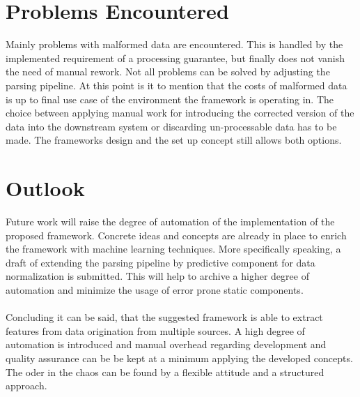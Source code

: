 \section{Problems Encountered\label{sec:problems}}

Mainly problems with malformed data are encountered. This is handled by the implemented requirement of a processing guarantee, but finally does not vanish the need of manual rework. Not all problems can be solved by adjusting the parsing pipeline. At this point is it to mention that the costs of malformed data is up to final use case of the environment the framework is operating in. The choice between applying manual work for introducing the corrected version of the data into the downstream system or discarding un-processable data has to be made. The frameworks design and the set up concept still allows both options. 

\section{Outlook\label{sec:outlook}}

Future work will raise the degree of automation of the implementation of the proposed framework. Concrete ideas and concepts are already in place to enrich the framework with machine learning techniques. More specifically speaking, a draft of extending the parsing pipeline by predictive component for data normalization is submitted. This will help to archive a higher degree of automation and minimize the usage of error prone static components.
\\\\
Concluding it can be said, that the suggested framework is able to extract features from data origination from multiple sources. A high degree of automation is introduced and manual overhead regarding development and quality assurance can be be kept at a minimum applying the developed concepts. The oder in the chaos can be found by a flexible attitude and a structured approach. 